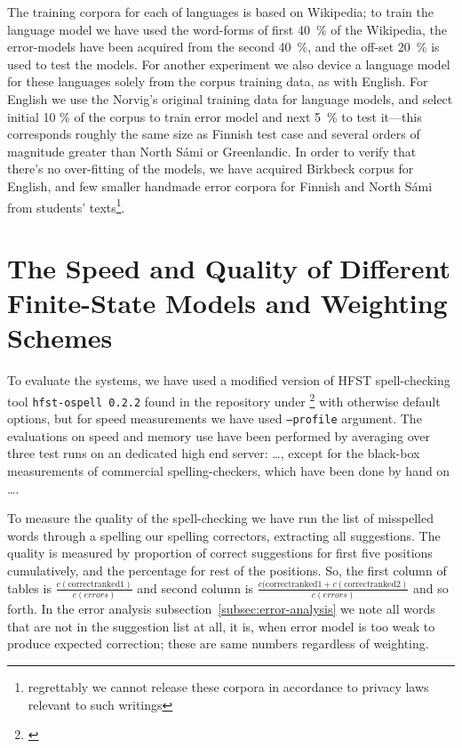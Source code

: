 \documentclass[a4paper,12pt]{article}
\begin{document}
The training corpora for each of languages is based on Wikipedia; to train the
language model we have used the word-forms of first 40~\% of the Wikipedia, the
error-models have been acquired from the second 40~\%, and the off-set 20~\% is
used to test the models. For another experiment we also device a language model
for these languages solely from the corpus training data, as with English.  For
English we use the Norvig's original training data for language models, and
select initial 10 \% of the corpus to train error model and next 5~\% to test
 it---this corresponds roughly the same
size as Finnish test case and several orders of magnitude greater than North
Sámi or Greenlandic. In order to verify that there's no over-fitting of the
models, we have acquired Birkbeck corpus for English, and few smaller handmade
error corpora for Finnish and North Sámi from students'
texts\footnote{regrettably we cannot release these corpora in accordance to
privacy laws relevant to such writings}.

\section{The Speed and Quality of Different Finite-State Models and Weighting
Schemes}
\label{sec:evaluation}

To evaluate the systems, we have used a modified version of HFST spell-checking
tool \texttt{hfst-ospell 0.2.2} found in the repository under 
\footnote{\url{}} with otherwise default
options, but for speed measurements we have used \texttt{--profile} argument.
The evaluations on speed and memory use have been performed by averaging over
three test runs on an dedicated high end server: \ldots, except for the
black-box measurements of commercial spelling-checkers, which have been done by
hand on \ldots.

To measure the quality of the spell-checking we have run the list of misspelled
words through a spelling our spelling correctors, extracting all suggestions.
The quality is measured by proportion of correct suggestions for first five
positions cumulatively, and the percentage for rest of the positions. So, the
first column of tables is $\frac{c(\mathrm{correct ranked 1})}{c(errors)}$ and
second column is $\frac{c(\mathrm{correct ranked 1} + c(\mathrm{correct ranked
2})}{c(errors)}$ and so forth. In the error analysis
subsection~\ref{subsec:error-analysis} we note all words that are not in the
suggestion list at all, it is, when error model is too weak to produce expected
correction; these are same numbers regardless of weighting.
\end{document}
